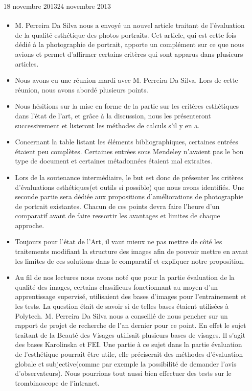 \documentclass[11pt, french,screen]{report-rd-info}
\begin{document}
\begin{fichesuivi}{18 novembre 2013}{24 novembre 2013}
\paragraph{}
	\begin{echange}
		\begin{itemize}
			\item M. Perreira Da Silva nous a envoyé un nouvel article traitant de l'évaluation de la qualité esthétique des photos portraits. Cet article, qui est cette fois dédié à la photographie de portrait, apporte un complément sur ce que nous avions et permet d'affirmer certains critères qui sont apparus dans plusieurs articles.
			\item Nous avons eu une réunion mardi avec M. Perreira Da Silva. Lors de cette réunion, nous avons abordé plusieurs points.
			\item Nous hésitions sur la mise en forme de la partie sur les critères esthétiques dans l'état de l'art, et grâce à la discussion, nous les présenteront successivement et listeront les méthodes de calculs s'il y en a.
			\item Concernant la table listant les éléments bibliographiques, certaines entrées étaient peu complètes. Certaines entrées sous Mendeley n'avaient pas le bon type de document et certaines métadonnées étaient mal extraites.
			 \item Lors de la soutenance intermédiaire, le but est donc de présenter les critères d'évaluations esthétiques(et outils si possible) que nous avons identifiés. Une seconde partie sera dédiée aux propositions d'améliorations de photographie de portrait existantes. Chacun de ces points devra faire l'heure d'un comparatif avant de faire ressortir les avantages et limites de chaque approche.
			\item Toujours pour l'état de l'Art, il vaut mieux ne pas mettre de côté les traitements modifiant la structure des images afin de pouvoir mettre en avant les limites de ces solutions dans le comparatif et expliquer notre proposition.
			\item Au fil de nos lectures nous avons noté que pour la partie évaluation de la qualité des images, certains classifieurs fonctionnant au moyen d'un apprentissage supervisé, utilisaient des bases d'images pour l'entrainement et les tests. La question était de savoir si de telles bases étaient utilisées à Polytech. M. Perreira Da Silva nous a conseillé de nous pencher sur un rapport de projet de recherche de l'an dernier pour ce point. En effet le sujet traitant de la Beauté des Visages utilisait plusieurs bases de visages. Il s'agit des bases Karolinska et FEI. Une partie à ce sujet dans la partie évaluation de l'esthétique pourrait être utile, elle préciserait des méthodes d'évaluation globale et subjective(comme par exemple la possibilité de demander l'avis d'observateurs). Nous pourrions tout aussi bien effectuer des tests sur le trombinoscope de l'intranet.

\end{itemize}
\end{echange}
\end{fichesuivi}
\end{document}
